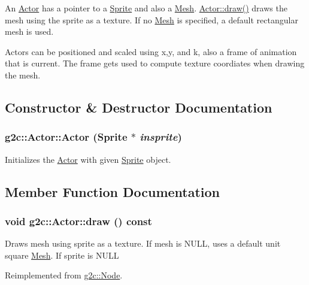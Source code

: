 An \hyperlink{classg2c_1_1_actor}{Actor} has a pointer to a \hyperlink{classg2c_1_1_sprite}{Sprite} and also a \hyperlink{classg2c_1_1_mesh}{Mesh}. \hyperlink{classg2c_1_1_actor_a587aff8d8df73dbba0c659459e094074}{Actor::draw()} draws the mesh using the sprite as a texture. If no \hyperlink{classg2c_1_1_mesh}{Mesh} is specified, a default rectangular mesh is used.

Actors can be positioned and scaled using x,y, and k, also a frame of animation that is current. The frame gets used to compute texture coordiates when drawing the mesh. 

\subsection{Constructor \& Destructor Documentation}
\hypertarget{classg2c_1_1_actor_a1451aed47353957d0f8d74ee50c7104a}{
\subsubsection[{Actor}]{\setlength{\rightskip}{0pt plus 5cm}g2c::Actor::Actor ({\bf Sprite} $\ast$ {\em insprite})}}
\label{classg2c_1_1_actor_a1451aed47353957d0f8d74ee50c7104a}
Initializes the \hyperlink{classg2c_1_1_actor}{Actor} with given \hyperlink{classg2c_1_1_sprite}{Sprite} object. 

\subsection{Member Function Documentation}
\hypertarget{classg2c_1_1_actor_a587aff8d8df73dbba0c659459e094074}{
\subsubsection[{draw}]{\setlength{\rightskip}{0pt plus 5cm}void g2c::Actor::draw () const}}
\label{classg2c_1_1_actor_a587aff8d8df73dbba0c659459e094074}
Draws mesh using sprite as a texture. If mesh is NULL, uses a default unit square \hyperlink{classg2c_1_1_mesh}{Mesh}. If sprite is NULL 

Reimplemented from \hyperlink{classg2c_1_1_node}{g2c::Node}.

